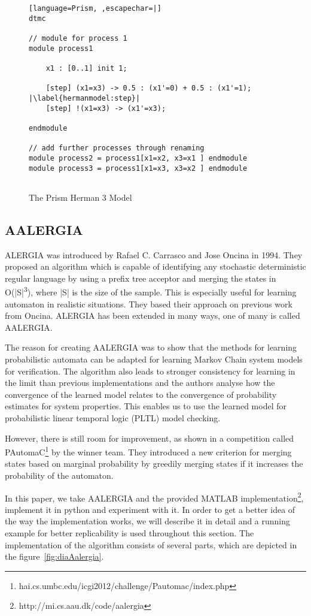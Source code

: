 \documentclass[
a4paper,
12pt
]{scrartcl}
\begin{document}
\begin{figure}[ht!]
\begin{lstlisting}[language=Prism, ,escapechar=|]
dtmc

// module for process 1
module process1

	x1 : [0..1] init 1;
	
	[step] (x1=x3) -> 0.5 : (x1'=0) + 0.5 : (x1'=1); |\label{hermanmodel:step}|
	[step] !(x1=x3) -> (x1'=x3);
	
endmodule

// add further processes through renaming
module process2 = process1[x1=x2, x3=x1 ] endmodule
module process3 = process1[x1=x3, x3=x2 ] endmodule


\end{lstlisting}
\caption{The Prism Herman 3 Model}
\label{fig:hermanmodel}
\end{figure}

\subsection{AALERGIA}
ALERGIA\cite{Carrasco.1994} was introduced by Rafael C. Carrasco and Jose Oncina in 1994. They proposed an algorithm which is capable of identifying any stochastic deterministic regular language by using a prefix tree acceptor and merging the states in O(|S|\textsuperscript{3}), where |S| is the size of the sample. This is especially useful for learning automaton in realistic situations. They based their approach on previous work from Oncina\cite{Oncina92}. ALERGIA has been extended in many ways, one of many is called AALERGIA\cite{Mao.}.
\par The reason for creating AALERGIA was to show that the methods for learning probabilistic automata can be adapted for learning Markov Chain system models for verification. The algorithm also leads to stronger consistency for learning in the limit than previous implementations and the authors analyse how the convergence of the learned model relates to the convergence of probability estimates for system properties. This enables us to use the learned model for probabilistic linear temporal logic (PLTL) model checking.
\par However, there is still room for improvement, as shown in a competition called PAutomaC\footnote{hai.cs.umbc.edu/icgi2012/challenge/Pautomac/index.php} by the winner team\cite{Shibata_the11th}. They introduced a new criterion for merging states based on marginal probability by greedily merging states if it increases the probability of the automaton.
\par In this paper, we take AALERGIA and the provided MATLAB implementation\footnote{http://mi.cs.aau.dk/code/aalergia}, implement it in python and experiment with it. In order to get a better idea of the way the implementation works, we will describe it in detail and a running example for better replicability is used throughout this section. The implementation of the algorithm consists of several parts, which are depicted in the figure~\ref{fig:diaAalergia}.
\end{document}
